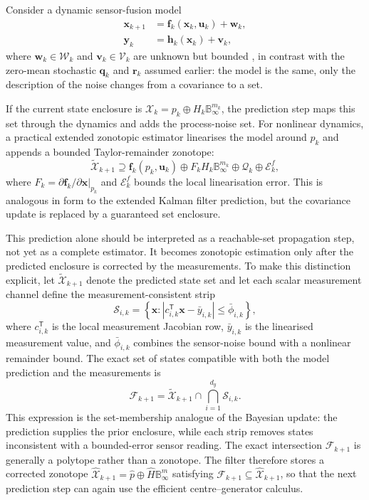 Consider a dynamic sensor-fusion model
\begin{align}
\mathbf{x}_{k+1}&=\mathbf{f}_k(\mathbf{x}_k,\mathbf{u}_k)+\mathbf{w}_k,\\
\mathbf{y}_k&=\mathbf{h}_k(\mathbf{x}_k)+\mathbf{v}_k,
\end{align}
where $\mathbf{w}_k\in\mathcal{W}_k$ and $\mathbf{v}_k\in\mathcal{V}_k$ are unknown but bounded
, in contrast with the zero-mean stochastic $\mathbf{q}_k$ and $\mathbf{r}_k$ assumed earlier: the model is the same, only the description of the noise changes from a covariance to a set. 

If the current state enclosure is $\mathcal{X}_k=p_k\oplus H_k\mathbb{B}_{\infty}^{m_k}$, the prediction step maps this set through the dynamics and adds the process-noise set. For nonlinear dynamics, a practical extended zonotopic estimator linearises the model around $p_k$ and appends a bounded Taylor-remainder zonotope:
\begin{equation}
\widetilde{\mathcal{X}}_{k+1}
\supseteq
\mathbf{f}_k(p_k,\mathbf{u}_k)
\oplus F_k H_k\mathbb{B}_{\infty}^{m_k}
\oplus \mathcal{Q}_k
\oplus \mathcal{E}^{f}_k,
\end{equation}
where $F_k=\partial \mathbf{f}_k/\partial \mathbf{x}|_{p_k}$ and $\mathcal{E}^{f}_k$ bounds the local linearisation error. This is analogous in form to the extended Kalman filter prediction, but the covariance update is replaced by a guaranteed set enclosure.

This prediction alone should be interpreted as a reachable-set propagation step, not yet as a complete estimator. It becomes zonotopic estimation only after the predicted enclosure is corrected by the measurements. To make this distinction explicit, let $\widetilde{\mathcal{X}}_{k+1}$ denote the predicted state set and let each scalar measurement channel define the measurement-consistent strip
\begin{equation}
\mathcal{S}_{i,k}
=
\left\{\mathbf{x}:\left|c_{i,k}^{\mathsf T}\mathbf{x}-\bar y_{i,k}\right|
\leq \bar\phi_{i,k}\right\},
\end{equation}
where $c_{i,k}^{\mathsf T}$ is the local measurement Jacobian row, $\bar y_{i,k}$ is the linearised measurement value, and $\bar\phi_{i,k}$ combines the sensor-noise bound with a nonlinear remainder bound. The exact set of states compatible with both the model prediction and the measurements is
\begin{equation}
\mathcal{F}_{k+1}
=
\widetilde{\mathcal{X}}_{k+1}
\cap
\bigcap_{i=1}^{d_y}\mathcal{S}_{i,k}.
\end{equation}
This expression is the set-membership analogue of the Bayesian update: the prediction supplies the prior enclosure, while each strip removes states inconsistent with a bounded-error sensor reading. The exact intersection $\mathcal{F}_{k+1}$ is generally a polytope rather than a zonotope. The filter therefore stores a corrected zonotope $\hat{\mathcal{X}}_{k+1}=\hat p\oplus\hat H\mathbb{B}_{\infty}^{\hat m}$ satisfying $\mathcal{F}_{k+1}\subseteq\hat{\mathcal{X}}_{k+1}$, so that the next prediction step can again use the efficient centre--generator calculus.

